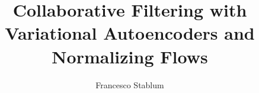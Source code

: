 \documentclass[12pt]{article}
\author{Francesco Stablum}
\title{Collaborative Filtering with Variational Autoencoders and Normalizing Flows}
\begin{document}
\maketitle

\newcommand{\addchap}[1]{\section*{#1}}

%
%
%
%
%
%
%

%
%

%
%
%
%
%
%
%
%
%
%
%
%
%
%
%
%
%
%
%
%
%
%
\end{document}

